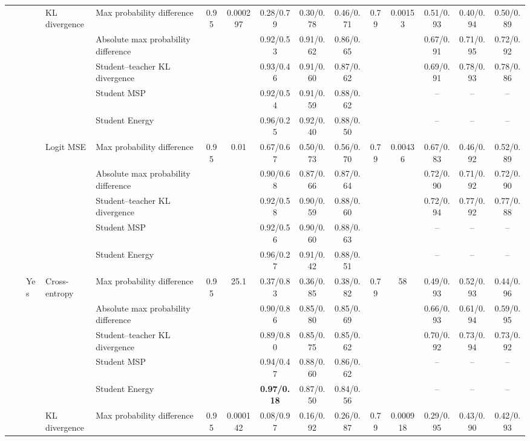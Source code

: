 \documentclass[border=2pt]{standalone}
\begin{document}
\begin{tabular}{lllllcccccccccc}
 &  &  & KL divergence & Max probability difference & 0.95 & 0.000297 & 0.28/0.79 & 0.30/0.78 & 0.46/0.71 & 0.79 & 0.00153 & 0.51/0.93 & 0.40/0.94 & 0.50/0.89 \\
 &  &  &  & Absolute max probability difference &  &  & 0.92/0.53 & 0.91/0.62 & 0.86/0.65 &  &  & 0.67/0.91 & 0.71/0.95 & 0.72/0.92 \\
 &  &  &  & Student--teacher KL divergence &  &  & 0.93/0.46 & 0.91/0.60 & 0.87/0.62 &  &  & 0.69/0.91 & 0.78/0.93 & 0.78/0.86 \\
 &  &  &  & Student MSP &  &  & 0.92/0.54 & 0.91/0.59 & 0.88/0.62 &  &  & -- & -- & -- \\
 &  &  &  & Student Energy &  &  & 0.96/0.25 & 0.92/0.40 & 0.88/0.50 &  &  & -- & -- & -- \\
 &  &  & Logit MSE & Max probability difference & 0.95 & 0.01 & 0.67/0.67 & 0.50/0.73 & 0.56/0.70 & 0.79 & 0.00436 & 0.67/0.83 & 0.46/0.92 & 0.52/0.89 \\
 &  &  &  & Absolute max probability difference &  &  & 0.90/0.68 & 0.87/0.66 & 0.87/0.64 &  &  & 0.72/0.90 & 0.71/0.92 & 0.72/0.90 \\
 &  &  &  & Student--teacher KL divergence &  &  & 0.92/0.58 & 0.90/0.59 & 0.88/0.60 &  &  & 0.72/0.94 & 0.77/0.92 & 0.77/0.88 \\
 &  &  &  & Student MSP &  &  & 0.92/0.56 & 0.90/0.60 & 0.88/0.63 &  &  & -- & -- & -- \\
 &  &  &  & Student Energy &  &  & 0.96/0.27 & 0.91/0.42 & 0.88/0.51 &  &  & -- & -- & -- \\
 &  & Yes & Cross-entropy & Max probability difference & 0.95 & 25.1 & 0.37/0.83 & 0.36/0.85 & 0.38/0.82 & 0.79 & 58 & 0.49/0.93 & 0.52/0.93 & 0.44/0.96 \\
 &  &  &  & Absolute max probability difference &  &  & 0.90/0.86 & 0.85/0.80 & 0.85/0.69 &  &  & 0.66/0.93 & 0.61/0.94 & 0.59/0.95 \\
 &  &  &  & Student--teacher KL divergence &  &  & 0.89/0.80 & 0.85/0.75 & 0.85/0.62 &  &  & 0.70/0.92 & 0.73/0.94 & 0.73/0.92 \\
 &  &  &  & Student MSP &  &  & 0.94/0.47 & 0.88/0.60 & 0.86/0.62 &  &  & -- & -- & -- \\
 &  &  &  & Student Energy &  &  & \textbf{0.97/0.18} & 0.87/0.50 & 0.84/0.56 &  &  & -- & -- & -- \\
 &  &  & KL divergence & Max probability difference & 0.95 & 0.000142 & 0.08/0.97 & 0.16/0.92 & 0.26/0.87 & 0.79 & 0.000918 & 0.29/0.95 & 0.43/0.90 & 0.42/0.93 \\

\end{tabular}
\end{document}
